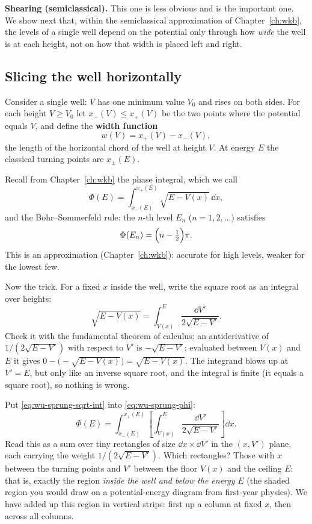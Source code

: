 \textbf{Shearing (semiclassical).} This one is less obvious and is the important one. We show next that, within the semiclassical approximation of Chapter~\ref{ch:wkb}, the levels of a single well depend on the potential only through how \emph{wide} the well is at each height, not on how that width is placed left and right.

\subsection{Slicing the well horizontally}

Consider a single well: $V$ has one minimum value $V_0$ and rises on both sides. For each height $V\ge V_0$ let $x_-(V)\le x_+(V)$ be the two points where the potential equals $V$, and define the \textbf{width function}
\begin{equation}
w(V)=x_+(V)-x_-(V),
\label{eq:wu-sprung-width-def}
\end{equation}
the length of the horizontal chord of the well at height $V$. At energy $E$ the classical turning points are $x_\pm(E)$.

Recall from Chapter~\ref{ch:wkb} the phase integral, which we call
\begin{equation}
\Phi(E)=\int_{x_-(E)}^{x_+(E)}\sqrt{E-V(x)}\,\dd x ,
\label{eq:wu-sprung-phi}
\end{equation}
and the Bohr--Sommerfeld rule: the $n$-th level $E_n$ ($n=1,2,\dots$) satisfies
\begin{equation}
\Phi(E_n)=\Bigl(n-\tfrac12\Bigr)\pi .
\label{eq:wu-sprung-bs}
\end{equation}
This is an approximation (Chapter~\ref{ch:wkb}): accurate for high levels, weaker for the lowest few.

Now the trick. For a fixed $x$ inside the well, write the square root as an integral over heights:
\begin{equation}
\sqrt{E-V(x)}=\int_{V(x)}^{E}\frac{\dd V'}{2\sqrt{E-V'}} .
\label{eq:wu-sprung-sqrt-int}
\end{equation}
Check it with the fundamental theorem of calculus: an antiderivative of $1/(2\sqrt{E-V'})$ with respect to $V'$ is $-\sqrt{E-V'}$; evaluated between $V(x)$ and $E$ it gives $0-\bigl(-\sqrt{E-V(x)}\bigr)=\sqrt{E-V(x)}$. The integrand blows up at $V'=E$, but only like an inverse square root, and the integral is finite (it equals a square root), so nothing is wrong.

Put \eqref{eq:wu-sprung-sqrt-int} into \eqref{eq:wu-sprung-phi}:
\begin{equation}
\Phi(E)=\int_{x_-(E)}^{x_+(E)}\left[\int_{V(x)}^{E}\frac{\dd V'}{2\sqrt{E-V'}}\right]\dd x .
\label{eq:wu-sprung-double}
\end{equation}
Read this as a sum over tiny rectangles of size $\dd x\times\dd V'$ in the $(x,V')$ plane, each carrying the weight $1/(2\sqrt{E-V'})$. Which rectangles? Those with $x$ between the turning points and $V'$ between the floor $V(x)$ and the ceiling $E$: that is, exactly the region \emph{inside the well and below the energy} $E$ (the shaded region you would draw on a potential-energy diagram from first-year physics). We have added up this region in vertical strips: first up a column at fixed $x$, then across all columns.

